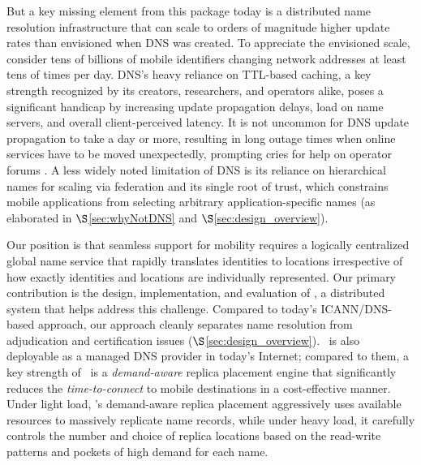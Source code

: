 But a key missing element from this package today is a distributed name resolution infrastructure that can scale to orders of magnitude higher update rates than envisioned when DNS was created. To appreciate the envisioned scale, consider tens of billions of mobile identifiers changing network addresses at least tens of times per day. DNS's heavy reliance on TTL-based caching, a key strength recognized by its creators, researchers, and operators alike, poses a significant handicap by increasing update propagation delays, load on name servers, and overall client-perceived latency. It is not uncommon for DNS update propagation to take a day or more, resulting in long  outage times when online services have to be moved unexpectedly, prompting cries for help on operator forums \cite{serverfault,dns-long-update}. A less widely noted limitation of DNS is its reliance on hierarchical names for scaling via federation and its single root of trust, which constrains mobile applications from selecting arbitrary application-specific names (as elaborated in $\S$\ref{sec:whyNotDNS} and $\S$\ref{sec:design_overview}).





Our position is that seamless support for mobility requires a logically centralized global name service that rapidly translates identities to locations irrespective of how exactly identities and locations are individually represented. Our primary contribution is the design, implementation, and evaluation of \auspice, a distributed system that helps address this challenge. Compared to today's ICANN/DNS-based approach, our approach cleanly separates name resolution from adjudication and certification issues ($\S$\ref{sec:design_overview}). \auspice\ is also deployable as a managed DNS provider in today's Internet; compared to them, a key strength of \auspice\ is a {\em demand-aware} replica placement engine that significantly reduces the {\em time-to-connect} to mobile destinations in a cost-effective manner. Under light load, \auspice's demand-aware replica placement aggressively uses available resources to massively replicate name records, while under heavy load, it carefully controls the number and choice of replica locations based on the read-write patterns and pockets of high demand for each name.

